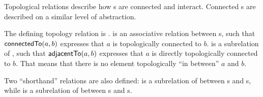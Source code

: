 Topological relations describe how s are
connected and interact.
Connected s are described on a similar
level of abstraction.

The defining topology relation is .
%
 is an associative relation between s,
such that $\textsf{connectedTo}(a,b)$ expresses that $a$ is topologically
connected to $b$.
%
 is a subrelation of , such
that $\textsf{adjacentTo}(a,b)$ expresses that $a$ is directly
topologically connected to $b$. That means that there is no element
topologically ``in between'' $a$ and $b$.

Two ``shorthand'' relations are also defined:
%
 is a subrelation of  between s and s, while
%
 is a subrelation of  between s and s.

